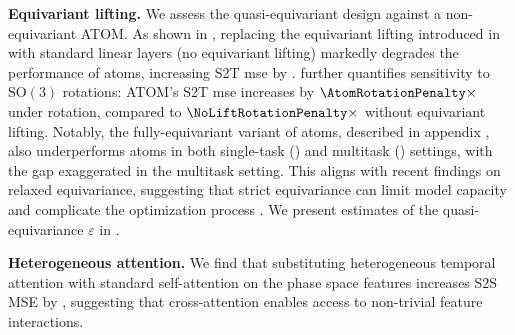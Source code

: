 \begin{figure}
    \centering
    \setlength{\extrarowheight}{1pt}   %
    \vspace{-10pt}
    \label{tab:equivariance_error}
\end{figure}

\textbf{Equivariant lifting.} We assess the quasi-equivariant design against a non-equivariant ATOM. As shown in , replacing the equivariant lifting introduced in  with standard linear layers (no equivariant lifting) markedly degrades the performance of \gls{atoms}, increasing S2T \gls{mse} by \NoEquivariantLiftingvsDefault{}.  further quantifies sensitivity to \(\mathrm{SO}(3)\) rotations: ATOM's S2T \gls{mse} increases by \(\AtomRotationPenalty\times\) under rotation, compared to \(\NoLiftRotationPenalty\times\) without equivariant lifting. Notably, the fully-equivariant variant of \gls{atoms}, described in appendix , also underperforms \gls{atoms} in both single-task () and multitask () settings, with the gap exaggerated in the multitask setting. This aligns with recent findings on relaxed equivariance, suggesting that strict equivariance can limit model capacity and complicate the optimization process \cite{elhag_relaxed_2025}. We present estimates of the quasi-equivariance \(\varepsilon\) in .

\textbf{Heterogeneous attention.} We find that substituting heterogeneous temporal attention with standard self-attention on the phase space features increases S2S MSE by \CrossAttvsStdAtt{}, suggesting that cross-attention enables access to non-trivial feature interactions.

